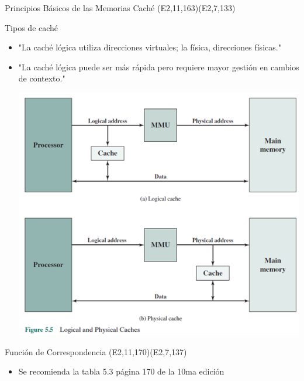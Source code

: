 \documentclass[presentation]{beamer}
\begin{document}
\begin{frame}[label={sec:orge6152e4}]{Principios Básicos de las Memorias Caché (E2,11,163)(E2,7,133)}
\begin{block}{Tipos de caché}
\begin{itemize}
\item "La caché lógica utiliza direcciones virtuales; la física, direcciones físicas."
\item "La caché lógica puede ser más rápida pero requiere mayor gestión en cambios de contexto."
\begin{center}
\includegraphics[width=.9\linewidth]{./Imagenes/fig5.png}
\end{center}
\end{itemize}
\end{block}
\end{frame}




\begin{frame}[label={sec:org3b03b5a}]{Función de Correspondencia (E2,11,170)(E2,7,137)}
\begin{itemize}
\item Se recomienda la tabla 5.3 página 170 de la 10ma edición
\end{itemize}
\end{frame}
\end{document}
